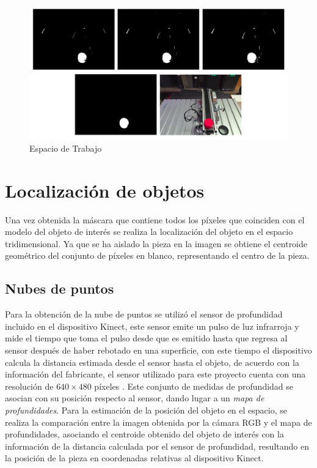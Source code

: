 \begin{figure}[H]
\centering
\includegraphics[width=\textwidth]{Figures/Masks_WS_3.png}
    \caption{Espacio de Trabajo}
    \label{fig:Masks_WorkSpace}
\end{figure}

\section{Localización de objetos}

Una vez obtenida la máscara que contiene todos los píxeles que coinciden con el modelo del objeto de interés se realiza la localización del objeto en el espacio tridimensional. Ya que se ha aislado la pieza en la imagen se obtiene el centroide geométrico del conjunto de píxeles en blanco, representando el centro de la pieza. 


\subsection{Nubes de puntos}

Para la obtención de la nube de puntos se utilizó el sensor de profundidad incluido en el dispositivo Kinect, este sensor emite un pulso de luz infrarroja y mide el tiempo que toma el pulso desde que es emitido hasta que regresa al sensor después de haber rebotado en una superficie, con este tiempo el dispositivo calcula la distancia estimada desde el sensor hasta el objeto, de acuerdo con la información del fabricante, el sensor utilizado para este proyecto cuenta con una resolución de $640 \times 480$ píxeles \cite{davison_kinect_2012}. Este conjunto de medidas de profundidad se asocian con su posición respecto al sensor, dando lugar a un \textit{mapa de profundidades}. Para la estimación de la posición del objeto en el espacio, se realiza la comparación entre la imagen obtenida por la cámara RGB y el mapa de profundidades, asociando el centroide obtenido del objeto de interés con la información de la distancia calculada por el sensor de profundidad, resultando en la posición de la pieza en coordenadas relativas al dispositivo Kinect.
